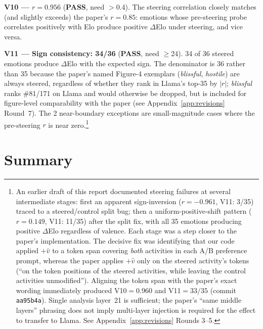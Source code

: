 \documentclass[11pt,a4paper]{article}
\newcommand{\pass}{\textcolor{passgreen}{\textbf{PASS}}}
\begin{document}
\textbf{V10 --- $r = 0.956$} (\pass, need $>$0.4).
The steering correlation closely matches (and slightly exceeds) the
paper's $r{=}0.85$: emotions whose pre-steering probe correlates
positively with Elo produce positive $\Delta$Elo under steering, and
vice versa.

\textbf{V11 --- Sign consistency: 34/36} (\pass, need $\geq$24).
34 of 36 steered emotions produce $\Delta$Elo with the expected sign.
The denominator is 36 rather than 35 because the paper's named
Figure-4 exemplars (\emph{blissful}, \emph{hostile}) are always
steered, regardless of whether they rank in Llama's top-35 by $|r|$;
\emph{blissful} ranks \#81/171 on Llama and would otherwise be
dropped, but is included for figure-level comparability with the
paper (see Appendix~\ref{app:revisions} Round~7).  The 2
near-boundary exceptions are small-magnitude cases where the
pre-steering $r$ is near zero.\footnote{An earlier draft of this
report documented steering failures at several intermediate stages:
first an apparent sign-inversion ($r{=}-0.961$, V11: 3/35) traced to a
steered/control split bug; then a uniform-positive-shift pattern
($r{=}0.149$, V11: 11/35) after the split fix, with all 35 emotions
producing positive $\Delta$Elo regardless of valence.  Each stage was
a step closer to the paper's implementation.  The decisive fix was
identifying that our code applied $+\hat v$ to a token span covering
\emph{both} activities in each A/B preference prompt, whereas the
paper applies $+\hat v$ only on the steered activity's tokens (``on
the token positions of the steered activities, while leaving the
control activities unmodified'').  Aligning the token span with the
paper's exact wording immediately produced V10$=0.960$ and V11$=33/35$
(commit \texttt{aa95b4a}).  Single analysis layer~21 is sufficient;
the paper's ``same middle layers'' phrasing does not imply
multi-layer injection is required for the effect to transfer to
Llama.  See Appendix~\ref{app:revisions} Rounds 3--5.}

\section{Summary}
\end{document}
